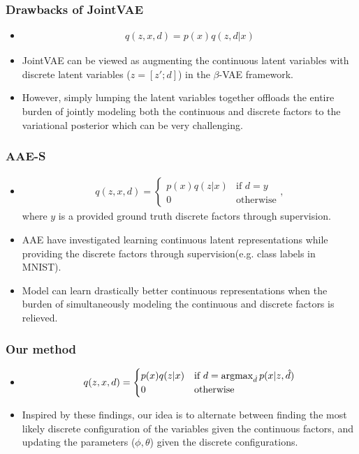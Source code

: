 \documentclass[10pt,mathserif]{beamer}
\begin{document}
\begin{frame}
\frametitle{Drawbacks of JointVAE}
\begin{itemize}\itemsep=12pt
\item 
\begin{align}
    q(z,x,d) = p(x)q(z,d|x)\nonumber
\end{align}
\item JointVAE can be viewed as  augmenting the continuous latent variables with discrete latent variables ($z=[z'; d]$) in the $\beta$-VAE framework.\pause
\item However, simply lumping the latent variables together offloads the entire burden of jointly modeling both the continuous and discrete factors to the variational posterior which can be very challenging.
\end{itemize}
\end{frame} 

\begin{frame}
\frametitle{AAE-S}
\begin{itemize}\itemsep=12pt
\item
\begin{align}
    q(z,x,d) = \begin{cases}p(x)q(z|x) & \text{if $d=y$} \\ 0 & \text{otherwise}\end{cases},\nonumber
\end{align}where $y$ is a provided ground truth discrete factors through supervision.
\item AAE have investigated learning continuous latent representations while providing the discrete factors through supervision(e.g. class labels in MNIST).\pause
\item Model can learn drastically better continuous representations when the burden of simultaneously modeling the continuous and discrete factors is relieved.
\end{itemize}
\end{frame} 

\begin{frame}
\frametitle{Our method}
\begin{itemize}\itemsep=12pt
\item
\begin{align}
    q(z,x,d) = \begin{cases}p(x)q(z|x) & \text{if $d = \mathop{\rm argmax}_{\hat{d}} p(x|z,\hat{d})$} \\0 &\text{otherwise}\end{cases}\nonumber
\end{align}
\item Inspired by these findings, our idea is to alternate between finding the most likely discrete configuration of the variables given the continuous factors, and updating the parameters ($\phi,\theta$) given the discrete configurations. 
\end{itemize}
\end{frame} 
\end{document}
